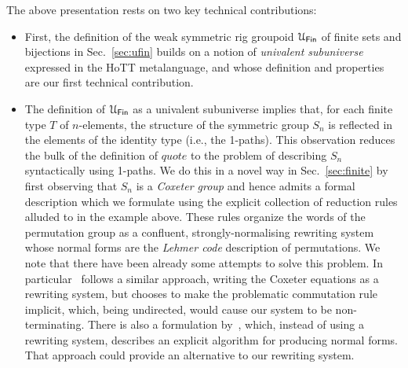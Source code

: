 
The above presentation rests on two key technical contributions:

\begin{itemize}
      \item First, the definition of the weak symmetric rig groupoid $\UFin$ of finite sets and bijections in
            Sec.~\ref{sec:ufin} builds on a notion of \emph{univalent subuniverse} expressed in the HoTT metalanguage, and
            whose definition and properties are our first technical contribution.
      \item The definition of $\UFin$ as a univalent subuniverse implies that, for each finite type $T$ of $n$-elements, the
            structure of the symmetric group $S_n$ is reflected in the elements of the identity type (i.e., the 1-paths).
            This observation reduces the bulk of the definition of $\mathit{quote}$ to the problem of describing $S_n$
            syntactically using 1-paths. We do this in a novel way in Sec.~\ref{sec:finite} by first observing that $S_n$ is
            a \emph{Coxeter group} and hence admits a formal description which we formulate using the explicit collection of
            reduction rules alluded to in the example above. These rules organize the words of the permutation group as a
            confluent, strongly-normalising rewriting system whose normal forms are the \emph{Lehmer code} description of
            permutations. We note that there have been already some attempts to solve this problem. In
            particular~\citet{LAFONT2003257} follows a similar approach, writing the Coxeter equations as a rewriting
            system, but chooses to make the problematic commutation rule implicit, which, being undirected, would cause our
            system to be non-terminating. There is also a formulation by~\citet{Hiver-coq}, which, instead of using a
            rewriting system, describes an explicit algorithm for producing normal forms. That approach could provide an
            alternative to our rewriting system.
\end{itemize}


